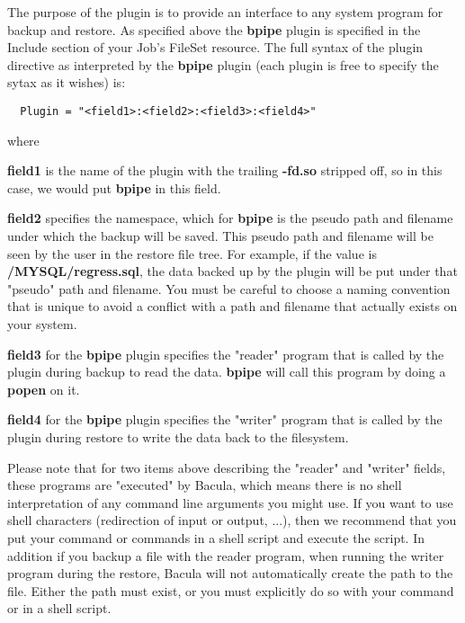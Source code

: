 The purpose of the plugin is to provide an interface to any system program for
backup and restore. As specified above the {\bf bpipe} plugin is specified in
the Include section of your Job's FileSet resource.  The full syntax of the
plugin directive as interpreted by the {\bf bpipe} plugin (each plugin is free
to specify the sytax as it wishes) is:

\begin{verbatim}
  Plugin = "<field1>:<field2>:<field3>:<field4>"
\end{verbatim}

where
\begin{description}
\item {\bf field1} is the name of the plugin with the trailing {\bf -fd.so}
stripped off, so in this case, we would put {\bf bpipe} in this field.

\item {\bf field2} specifies the namespace, which for {\bf bpipe} is the
pseudo path and filename under which the backup will be saved. This pseudo
path and filename will be seen by the user in the restore file tree.
For example, if the value is {\bf /MYSQL/regress.sql}, the data
backed up by the plugin will be put under that "pseudo" path and filename.
You must be careful to choose a naming convention that is unique to avoid
a conflict with a path and filename that actually exists on your system.

\item {\bf field3} for the {\bf bpipe} plugin 
specifies the "reader" program that is called by the plugin during
backup to read the data. {\bf bpipe} will call this program by doing a
{\bf popen} on it. 

\item {\bf field4} for the {\bf bpipe} plugin
specifies the "writer" program that is called by the plugin during
restore to write the data back to the filesystem.  
\end{description}

Please note that for two items above describing the "reader" and "writer"
fields, these programs are "executed" by Bacula, which
means there is no shell interpretation of any command line arguments
you might use.  If you want to use shell characters (redirection of input
or output, ...), then we recommend that you put your command or commands
in a shell script and execute the script. In addition if you backup a
file with the reader program, when running the writer program during
the restore, Bacula will not automatically create the path to the file.
Either the path must exist, or you must explicitly do so with your command
or in a shell script.

